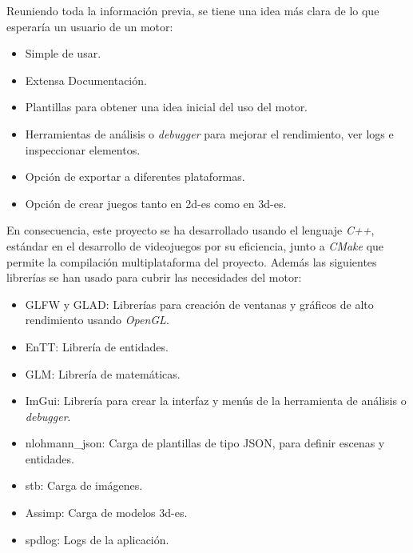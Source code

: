 Reuniendo toda la información previa, se tiene una idea más clara de lo que esperaría un usuario de un motor:
\begin{itemize}
    \item Simple de usar.
    \item Extensa Documentación.
    \item Plantillas para obtener una idea inicial del uso del motor.
    \item Herramientas de análisis o \textit{debugger} para mejorar el rendimiento, ver logs e inspeccionar elementos.
    \item Opción de exportar a diferentes plataformas.
    \item Opción de crear juegos tanto en \gls{2d-es} como en \gls{3d-es}.
\end{itemize}
En consecuencia, este proyecto se ha desarrollado usando el lenguaje \textit{C++}, estándar en el desarrollo de
videojuegos por su eficiencia, junto a \textit{CMake}\cite{cmake} que permite la compilación multiplataforma del proyecto.
Además las siguientes librerías se han usado para cubrir las necesidades del motor:
\begin{itemize}
    \item GLFW\cite{glfw} y GLAD\cite{glad}: Librerías para creación de ventanas y gráficos de alto rendimiento usando \textit{OpenGL}\cite{opengl}.
    \item EnTT\cite{entt}: Librería de entidades.
    \item GLM\cite{glm}: Librería de matemáticas.
    \item ImGui\cite{imgui}: Librería para crear la interfaz y menús de la herramienta de análisis o \textit{debugger}.
    \item nlohmann\_json\cite{nlohmann_json}: Carga de plantillas de tipo JSON, para definir escenas y entidades.
    \item stb\cite{stb}: Carga de imágenes.
    \item Assimp\cite{assimp}: Carga de modelos \gls{3d-es}.
    \item spdlog\cite{spdlog}: Logs de la aplicación.
\end{itemize}

\emptyPage